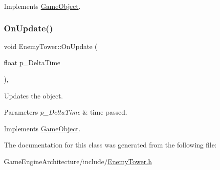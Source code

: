 Implements \mbox{\hyperlink{class_game_object_a162f15f809f5181e3264b9f4d768bea2}{Game\+Object}}.

\mbox{\label{class_enemy_tower_ab3ada6dea5a4020a48c2764315767aec}} 
\subsubsection{\texorpdfstring{OnUpdate()}{OnUpdate()}}
{\footnotesize\ttfamily void Enemy\+Tower\+::\+On\+Update (\begin{DoxyParamCaption}\item[{float}]{p\+\_\+\+Delta\+Time }\end{DoxyParamCaption})\hspace{0.3cm}{\ttfamily [override]}, {\ttfamily [virtual]}}



Updates the object. 


\begin{DoxyParams}{Parameters}
{\em p\+\_\+\+Delta\+Time} & time passed. \\
\hline
\end{DoxyParams}


Implements \mbox{\hyperlink{class_game_object_a3d4444ab3efd5e3041014da90a66c081}{Game\+Object}}.



The documentation for this class was generated from the following file\+:\begin{DoxyCompactItemize}
\item 
Game\+Engine\+Architecture/include/\mbox{\hyperlink{_enemy_tower_8h}{Enemy\+Tower.\+h}}\end{DoxyCompactItemize}
